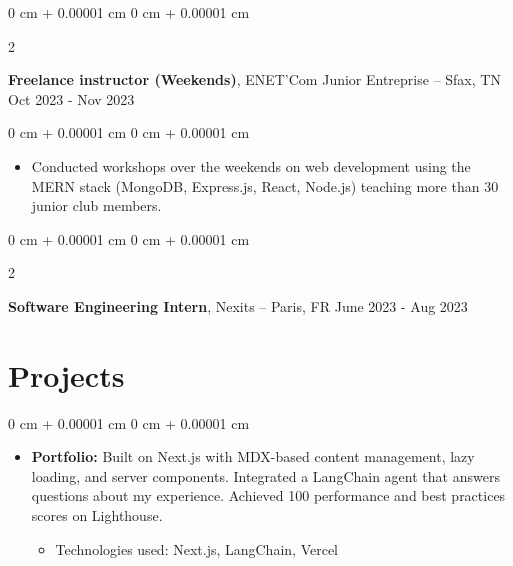 \documentclass[10pt, letterpaper]{article}
\newenvironment{highlights}{
  \begin{itemize}[
    topsep=0.10 cm,
    parsep=0.10 cm,
    partopsep=0pt,
    itemsep=0pt,
    leftmargin=0 cm + 10pt
    ]
  }{
\end{itemize}
}
\newenvironment{highlightsforbulletentries}{
  \begin{itemize}[
    topsep=0 cm,
    parsep=0.10 cm,
    partopsep=0pt,
    itemsep=0pt,
    leftmargin=10pt
    ]
  }{
\end{itemize}
} %
\newenvironment{onecolentry}{
  \begin{adjustwidth}{
      0 cm + 0.00001 cm
    }{
      0 cm + 0.00001 cm
    }
  }{
  \end{adjustwidth}
} %
\newenvironment{twocolentry}[2][]{
  \onecolentry
  \def\secondColumn{#2}
  \setcolumnwidth{\fill, 4.5 cm}
  \begin{paracol}{2}
  }{
    \switchcolumn \raggedleft \secondColumn
  \end{paracol}
  \end{onecolentry}
} %
\begin{document}
    \begin{twocolentry}{
      Oct 2023 - Nov 2023
    }
  \textbf{Freelance instructor (Weekends)}, ENET’Com Junior Entreprise  -- Sfax, TN\end{twocolentry}

  \vspace{0.10 cm}
  \begin{onecolentry}
    \begin{highlights}

    \item Conducted workshops over the weekends on web development using the MERN stack (MongoDB, Express.js, React, Node.js) teaching more than 30 junior club members.


    \end{highlights}

  \end{onecolentry}




  \begin{twocolentry}{
      June 2023 - Aug 2023
    }
  \textbf{Software Engineering Intern}, Nexits  -- Paris, FR\end{twocolentry}



\section{Projects}

\vspace{0.2 cm}
\begin{onecolentry}
  \begin{highlights}
  \item \textbf{Portfolio:} Built on Next.js with MDX-based content management, lazy loading, and server components. Integrated a LangChain agent that answers questions about my experience. Achieved 100 performance and best practices scores on Lighthouse.
    \begin{highlightsforbulletentries}
    \item Technologies used: Next.js, LangChain, Vercel
    \end{highlightsforbulletentries}
  \end{highlights}
\end{onecolentry}
\end{document}
